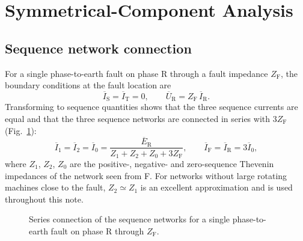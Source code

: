 \documentclass[a4paper,11pt]{article}
\newcommand{\ph}[1]{\mathrm{#1}}
\newcommand{\pE}[1]{\overline{E}_{\ph{#1}}}
\newcommand{\pU}[1]{\overline{U}_{\ph{#1}}}
\newcommand{\pI}[1]{\overline{I}_{#1}}
\begin{document}
\section{Symmetrical-Component Analysis}
\label{sec:seq}

\subsection{Sequence network connection}

For a single phase-to-earth fault on phase R through a fault impedance
$Z_\mathrm{F}$, the boundary conditions at the fault location are
\begin{equation}
\pI{\ph{S}} = \pI{\ph{T}} = 0, \qquad \pU{R} = Z_\mathrm{F}\,\pI{\ph{R}} .
\end{equation}
Transforming to sequence quantities shows that the three sequence currents are
equal and that the three sequence networks are connected in series with
$3Z_\mathrm{F}$ (Fig.~\ref{fig:seqnet}):
\begin{equation}
\pI{1} = \pI{2} = \pI{0}
 = \frac{\pE{R}}{Z_{1}+Z_{2}+Z_{0}+3Z_\mathrm{F}},
\qquad
\pI{\ph{F}} = \pI{\ph{R}} = 3\pI{0},
\label{eq:Iseq}
\end{equation}
where $Z_{1}$, $Z_{2}$, $Z_{0}$ are the positive-, negative- and zero-sequence
Thevenin impedances of the network seen from F. For networks without large
rotating machines close to the fault, $Z_{2}\simeq Z_{1}$ is an excellent
approximation and is used throughout this note.

\begin{figure}[htb]
\centering
{}
\caption{Series connection of the sequence networks for a single
phase-to-earth fault on phase R through $Z_\mathrm{F}$.}
\label{fig:seqnet}
\end{figure}
\end{document}
